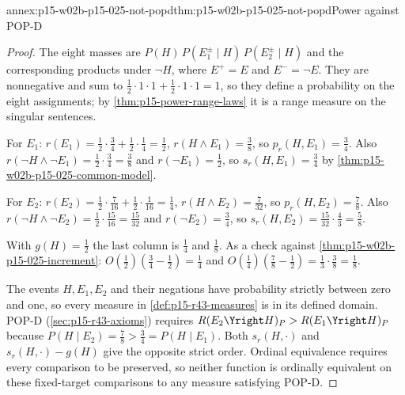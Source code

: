 \begin{annexitem}{annex:p15-w02b-p15-025-not-popd}{thm:p15-w02b-p15-025-not-popd}{Power against POP-D}
\begin{proof}
The eight masses are \(P(H)\,P(E_1^{\pm}\mid H)\,P(E_2^{\pm}\mid H)\)
and the corresponding products under \(\neg H\), where \(E^{+}=E\) and
\(E^{-}=\neg E\). They are nonnegative and sum to
\(\tfrac12\cdot1\cdot1+\tfrac12\cdot1\cdot1=1\), so they define a
probability on the eight assignments; by
\cref{thm:p15-power-range-laws} it is a range measure on the singular
sentences.

For \(E_1\):
\(r(E_1)=\tfrac12\cdot\tfrac34+\tfrac12\cdot\tfrac14=\tfrac12\),
\(r(H\wedge E_1)=\tfrac38\), so \(p_r(H,E_1)=\tfrac34\). Also
\(r(\neg H\wedge\neg E_1)=\tfrac12\cdot\tfrac34=\tfrac38\) and
\(r(\neg E_1)=\tfrac12\), so \(s_r(H,E_1)=\tfrac34\) by
\cref{thm:p15-w02b-p15-025-common-model}.

For \(E_2\):
\(r(E_2)=\tfrac12\cdot\tfrac7{16}+\tfrac12\cdot\tfrac1{16}=\tfrac14\),
\(r(H\wedge E_2)=\tfrac7{32}\), so \(p_r(H,E_2)=\tfrac78\). Also
\(r(\neg H\wedge\neg E_2)=\tfrac12\cdot\tfrac{15}{16}=\tfrac{15}{32}\) and
\(r(\neg E_2)=\tfrac34\), so \(s_r(H,E_2)=\tfrac{15}{32}\cdot\tfrac43
=\tfrac58\).

With \(g(H)=\tfrac12\) the last column is \(\tfrac14\) and \(\tfrac18\).
As a check against \cref{thm:p15-w02b-p15-025-increment}:
\(O(\tfrac12)(\tfrac34-\tfrac12)=\tfrac14\) and
\(O(\tfrac14)(\tfrac78-\tfrac12)=\tfrac13\cdot\tfrac38=\tfrac18\).

The events \(H,E_1,E_2\) and their negations have probability
strictly between zero and one, so every measure in
\cref{def:p15-r43-measures} is in its defined domain. POP-D
(\cref{sec:p15-r43-axioms}) requires
\(R(E_2\Yright H)_P>R(E_1\Yright H)_P\) because
\(P(H\mid E_2)=\tfrac78>\tfrac34=P(H\mid E_1)\). Both
\(s_r(H,\cdot)\) and \(s_r(H,\cdot)-g(H)\) give the opposite strict
order. Ordinal equivalence requires every comparison to be preserved,
so neither function is ordinally equivalent on these fixed-target
comparisons to any measure satisfying POP-D.
\end{proof}
\end{annexitem}


